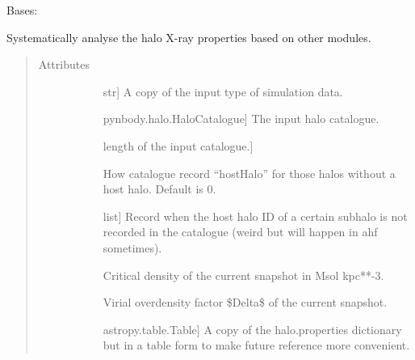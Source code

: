\documentclass[letterpaper,10pt,english]{sphinxmanual}
\begin{document}
\begin{fulllineitems}
\label{\detokenize{halo_analysis:modules.halo_analysis.halo_props}}
Bases: 

Systematically analyse the halo X-ray properties based 
on other modules.
\begin{quote}\begin{description}
\item[{Attributes}] \leavevmode\begin{description}
\item[{}] \leavevmode{[}str{]}
A copy of the input type of simulation data.

\item[{}] \leavevmode{[}pynbody.halo.HaloCatalogue{]}
The input halo catalogue.

\item[{}] \leavevmode{[}length of the input catalogue.{]}
\item[{}] \leavevmode
How catalogue record “hostHalo” for those halos 
without a host halo. Default is 0.

\item[{}] \leavevmode{[}list{]}
Record when the host halo ID of a certain subhalo is not 
recorded in the catalogue (weird but will happen in
ahf sometimes).

\item[{}] \leavevmode
Critical density of the current snapshot in Msol kpc**-3.

\item[{}] \leavevmode
Virial overdensity factor \$Delta\$ of the current snapshot.

\item[{}] \leavevmode{[}astropy.table.Table{]}
A copy of the halo.properties dictionary but in a table form
to make future reference more convenient.


\end{description}
\end{description}
\end{quote}
\end{fulllineitems}
\end{document}
